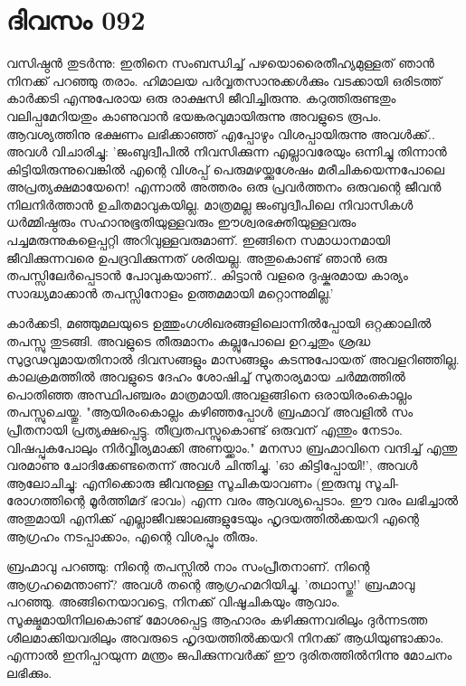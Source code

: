  
\section{ദിവസം 092}


വസിഷ്ഠന്‍ തുടര്‍ന്നു: ഇതിനെ സംബന്ധിച്ച്‌ പഴയൊരൈതീഹ്യമുള്ളത്‌ ഞാന്‍ നിനക്ക്‌ പറഞ്ഞു തരാം. ഹിമാലയ പര്‍വ്വതസാനുക്കള്‍ക്കും വടക്കായി ഒരിടത്ത്‌ കാര്‍ക്കടി എന്നുപേരായ ഒരു രാക്ഷസി ജീവിച്ചിരുന്നു. കറുത്തിരുണ്ടതും വലിപ്പമേറിയതും കാണുവാന്‍ ഭയങ്കരവുമായിരുന്നു അവളുടെ രൂപം. ആവശ്യത്തിനു ഭക്ഷണം ലഭിക്കാഞ്ഞ്‌ എപ്പോഴും വിശപ്പായിരുന്നു അവള്‍ക്ക്‌..  അവള്‍ വിചാരിച്ചു: 'ജംബുദ്വീപില്‍ നിവസിക്കുന്ന എല്ലാവരേയും ഒന്നിച്ചു തിന്നാന്‍ കിട്ടിയിരുന്നുവെങ്കില്‍ എന്റെ വിശപ്പ്‌ പെരുമഴയ്ക്കുശേഷം മരീചികയെന്നപോലെ അപ്രത്യക്ഷമായേനെ! എന്നാല്‍ അത്തരം ഒരു പ്രവര്‍ത്തനം ഒരുവന്റെ ജീവന്‍ നിലനിര്‍ത്താന്‍ ഉചിതമാവുകയില്ല. മാത്രമല്ല ജംബുദ്വീപിലെ നിവാസികള്‍ ധര്‍മ്മിഷ്ഠരും സഹാനുഭൂതിയുള്ളവരും ഈശ്വരഭക്തിയുള്ളവരും പച്ചമരുന്നുകളെപ്പറ്റി അറിവുള്ളവരുമാണ്‌. ഇങ്ങിനെ സമാധാനമായി ജീവിക്കുന്നവരെ ഉപദ്രവിക്കുന്നത്‌ ശരിയല്ല. അതുകൊണ്ട്‌ ഞാന്‍ ഒരു തപസ്സിലേര്‍പ്പെടാന്‍ പോവുകയാണ്‌..  കിട്ടാന്‍ വളരെ ദുഷ്കരമായ കാര്യം സാദ്ധ്യമാക്കാന്‍ തപസ്സിനോളം ഉത്തമമായി മറ്റൊന്നുമില്ല.'

കാര്‍ക്കടി, മഞ്ഞുമലയുടെ ഉത്തുംഗശിഖരങ്ങളിലൊന്നില്‍പ്പോയി ഒറ്റക്കാലില്‍ തപസ്സു തുടങ്ങി. അവളുടെ തീരുമാനം കല്ലുപോലെ ഉറച്ചതും ശ്രദ്ധ സുദൃഢവുമായതിനാല്‍ ദിവസങ്ങളും മാസങ്ങളും കടന്നുപോയത്‌ അവളറിഞ്ഞില്ല. കാലക്രമത്തില്‍ അവളുടെ ദേഹം ശോഷിച്ച്‌ സുതാര്യമായ ചര്‍മ്മത്തില്‍ പൊതിഞ്ഞ അസ്ഥിപഞ്ചരം മാത്രമായി.അവളങ്ങിനെ ഒരായിരംകൊല്ലം തപസ്സുചെയ്തു. "ആയിരംകൊല്ലം കഴിഞ്ഞപ്പോള്‍ ബ്രഹ്മാവ്‌ അവളില്‍ സം പ്രീതനായി പ്രത്യക്ഷപ്പെട്ടു. തീവ്രതപസ്സുകൊണ്ട്‌ ഒരുവന്‌ എന്തും നേടാം. വിഷപ്പുകപോലും നിര്‍വ്വീര്യമാക്കി അണയ്ക്കാം." മനസാ ബ്രഹ്മാവിനെ വന്ദിച്ച്‌ എന്തു വരമാണു ചോദിക്കേണ്ടതെന്ന് അവള്‍ ചിന്തിച്ചു. 'ഓ കിട്ടിപ്പോയി!', അവള്‍ ആലോചിച്ചു: എനിക്കൊരു ജീവനുള്ള സൂചികയാവണം (ഇരുമ്പു സൂചി- രോഗത്തിന്റെ മൂര്‍ത്തിമദ്‌ ഭാവം) എന്ന വരം ആവശ്യപ്പെടാം. ഈ വരം ലഭിച്ചാല്‍ അതുമായി എനിക്ക്‌ എല്ലാജീവജാലങ്ങളുടേയും ഹൃദയത്തില്‍ക്കയറി എന്റെ ആഗ്രഹം നടപ്പാക്കാം, എന്റെ വിശപ്പും തീരും. 

ബ്രഹ്മാവു പറഞ്ഞു: നിന്റെ തപസ്സില്‍ നാം സംപ്രീതനാണ്‌. നിന്റെ ആഗ്രഹമെന്താണ്‌? അവള്‍ തന്റെ ആഗ്രഹമറിയിച്ചു. 'തഥാസ്തു!' ബ്രഹ്മാവു പറഞ്ഞു. അങ്ങിനെയാവട്ടെ, നിനക്ക്‌ വിഷൂചികയും ആവാം. സൂക്ഷ്മമായിനിലകൊണ്ട്‌ മോശപ്പെട്ട ആഹാരം കഴിക്കുന്നവരിലും ദുര്‍ന്നടത്ത ശീലമാക്കിയവരിലും അവരുടെ ഹൃദയത്തില്‍ക്കയറി നിനക്ക്‌ ആധിയുണ്ടാക്കാം. എന്നാല്‍ ഇനിപ്പറയുന്ന മന്ത്രം ജപിക്കുന്നവര്‍ക്ക്‌ ഈ ദുരിതത്തില്‍നിന്നു മോചനം ലഭിക്കും.

